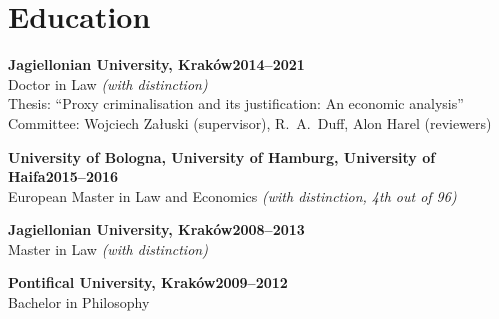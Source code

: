 \documentclass{resume}
\begin{document}
\section{Education}
\begin{content}
  \textbf{Jagiellonian University, Kraków}\hfill \textbf{2014--2021}\\
  Doctor in Law \emph{(with distinction)}\\
  Thesis: “Proxy criminalisation and its justification: An economic analysis”\\
  Committee: Wojciech Załuski (supervisor), R.~A.~Duff, Alon Harel (reviewers)

  \vspace{\baselineskip}
  \textbf{University of Bologna, University of Hamburg, University of Haifa}\hfill \textbf{2015--2016}\\
  European Master in Law and Economics \emph{(with distinction, 4th out of 96)}

  \vspace{\baselineskip}
  \textbf{Jagiellonian University, Kraków}\hfill \textbf{2008--2013}\\
  Master in Law \emph{(with distinction)}

  \vspace{\baselineskip}
  \textbf{Pontifical University, Kraków}\hfill \textbf{2009--2012}\\
  Bachelor in Philosophy
\sectionlineskip
\end{content}


\newcommand{\stayentry}[3]{%
  \begin{tabular}{@{}p{0.70\linewidth} >{\raggedleft\arraybackslash}p{0.27\linewidth}@{}}
    \textbf{#1} & #2 \\[-0.3em]
    \multicolumn{2}{@{}l}{\emph{#3}} \\[0.8em]
  \end{tabular}}

\newcommand{\stay}[3]{%
  \textbf{#1}\hfill #2\\[-0.3em]
  \emph{#3}\\[0.1em]}

  \newlength{\staysep}           %
\setlength{\staysep}{0.1em}    %
\end{document}
